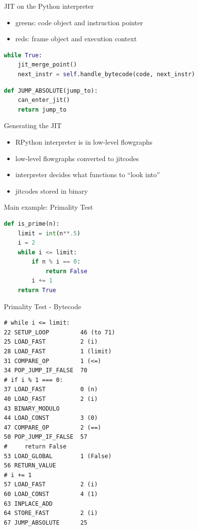 \documentclass[14pt]{beamer}
\begin{document}
\begin{frame}[fragile]{JIT on the Python interpreter}
\begin{itemize}
\item greens: code object and instruction pointer
\item reds: frame object and execution context
\end{itemize}
\begin{lstlisting}[language=Python]
while True:
    jit_merge_point()
    next_instr = self.handle_bytecode(code, next_instr)
\end{lstlisting}
\begin{lstlisting}[language=Python]
def JUMP_ABSOLUTE(jump_to):
    can_enter_jit()
    return jump_to
\end{lstlisting}
\end{frame}

\begin{frame}{Generating the JIT}
\begin{itemize}
\item RPython interpreter is in low-level flowgraphs
\item low-level flowgraphs converted to jitcodes
\item interpreter decides what functions to ``look into''
\item jitcodes stored in binary
\end{itemize}
\end{frame}

\begin{frame}[fragile]{Main example: Primality Test}
\begin{lstlisting}[language=Python]
def is_prime(n):
    limit = int(n**.5)
    i = 2
    while i <= limit:
        if n % i == 0:
            return False
        i += 1
    return True
\end{lstlisting}
\end{frame}

\begin{frame}[fragile]{Primality Test - Bytecode}
\tiny{
\begin{verbatim}
# while i <= limit:
22 SETUP_LOOP         46 (to 71)
25 LOAD_FAST          2 (i)
28 LOAD_FAST          1 (limit)
31 COMPARE_OP         1 (<=)
34 POP_JUMP_IF_FALSE  70
# if i % 1 === 0:
37 LOAD_FAST          0 (n)
40 LOAD_FAST          2 (i)
43 BINARY_MODULO       
44 LOAD_CONST         3 (0)
47 COMPARE_OP         2 (==)
50 POP_JUMP_IF_FALSE  57
#     return False
53 LOAD_GLOBAL        1 (False)
56 RETURN_VALUE        
# i += 1
57 LOAD_FAST          2 (i)
60 LOAD_CONST         4 (1)
63 INPLACE_ADD         
64 STORE_FAST         2 (i)
67 JUMP_ABSOLUTE      25
\end{verbatim}
}
\end{frame}
\end{document}
